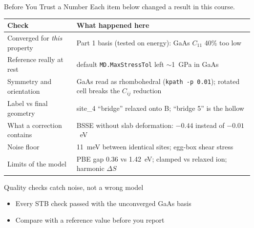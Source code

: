 \documentclass[8pt]{beamer}
\begin{document}
\begin{frame}{Before You Trust a Number}
	{\small Each item below changed a result in this course.}
	\par\vspace{0.15cm}
	\centering\small
	\setlength{\tabcolsep}{5pt}
	\renewcommand{\arraystretch}{1.15}
	\begin{tabular}{p{3.6cm}p{7.4cm}}
		\toprule
		\textbf{\color{stbteal}Check} & \textbf{\color{stbteal}What happened here} \\
		\midrule
		Converged for \emph{this} property & Part 1 basis (tested on energy): GaAs $C_{11}$ 40\% too low \\
		Reference really at rest & default \texttt{MD.MaxStressTol} left $\sim$1~GPa in GaAs \\
		Symmetry and orientation & GaAs read as rhombohedral (\texttt{kpath -p 0.01});
			rotated cell breaks the $C_{ij}$ reduction \\
		Label vs final geometry & site\_4 ``bridge'' relaxed onto B; ``bridge 5'' is the hollow \\
		What a correction contains & BSSE without slab deformation: $-0.44$ instead of $-0.01$~eV \\
		Noise floor & 11~meV between identical sites; egg-box shear stress \\
		Limits of the model & PBE gap 0.36 vs 1.42~eV; clamped vs relaxed ion; harmonic $\Delta S$ \\
		\bottomrule
	\end{tabular}
	\par\vspace{0.25cm}
	\begin{alertblock}{Quality checks catch noise, not a wrong model}
		\small
		\begin{itemize}
			\item Every STB check passed with the unconverged GaAs basis
			\item Compare with a reference value before you report
		\end{itemize}
	\end{alertblock}
\end{frame}
\end{document}

